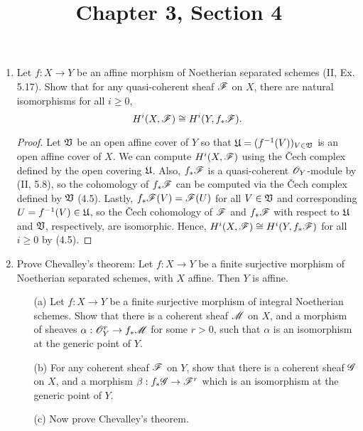 \documentclass[a4paper]{article}
\title{Chapter 3, Section 4}
\begin{document}
\maketitle
\begin{enumerate} [label=\textbf{\arabic*.}, leftmargin=0em]

\item Let $f : X \to Y$ be an affine morphism of Noetherian separated schemes (II, Ex. 5.17).
Show that for any quasi-coherent sheaf $\mathscr{F}$ on $X$, there are natural isomorphisms for all $i \geq 0$,
\begin{equation*}
  H^i(X, \mathscr{F}) \cong H^i(Y, f_* \mathscr{F}).
\end{equation*}

\begin{proof}
  Let $\mathfrak{V}$ be an open affine cover of $Y$ so that $\mathfrak{U} = (f^{-1}(V))_{V \in \mathfrak{V}}$ is an open affine cover of $X$.
  We can compute $H^i(X, \mathscr{F})$ using the Čech complex defined by the open covering $\mathfrak{U}$.
  Also, $f_*\mathscr{F}$ is a quasi-coherent $\mathscr{O}_Y$-module by (II, 5.8), so the cohomology of $f_*\mathscr{F}$ can be computed via the Čech complex defined by $\mathfrak{V}$ (4.5).
  Lastly, $f_*\mathscr{F}(V) = \mathscr{F}(U)$ for all $V \in \mathfrak{V}$ and corresponding $U = f^{-1}(V) \in \mathfrak{U}$, so the Čech cohomology of $\mathscr{F}$ and $f_*\mathscr{F}$ with respect to $\mathfrak{U}$ and $\mathfrak{V}$, respectively, are isomorphic.
  Hence, $H^i(X, \mathscr{F}) \cong H^i(Y, f_*\mathscr{F})$ for all $i \geq 0$ by (4.5).
\end{proof}

\item Prove Chevalley's theorem: Let $f : X \to Y$ be a finite surjective morphism of Noetherian separated schemes, with $X$ affine.
Then $Y$ is affine.
\begin{itemize}
  \item[(a)] Let $f : X \to Y$ be a finite surjective morphism of integral Noetherian schemes.
  Show that there is a coherent sheaf $\mathscr{M}$ on $X$, and a morphism of sheaves $\alpha : \mathscr{O}_Y^r \to f_* \mathscr{M}$ for some $r > 0$, such that $\alpha$ is an isomorphism at the generic point of $Y$.

  \item[(b)] For any coherent sheaf $\mathscr{F}$ on $Y$, show that there is a coherent sheaf $\mathscr{G}$ on $X$, and a morphism $\beta : f_* \mathscr{G} \to \mathscr{F}^r$ which is an isomorphism at the generic point of $Y$. 

  \item[(c)] Now prove Chevalley's theorem.
\end{itemize}


\end{enumerate}
\end{document}
